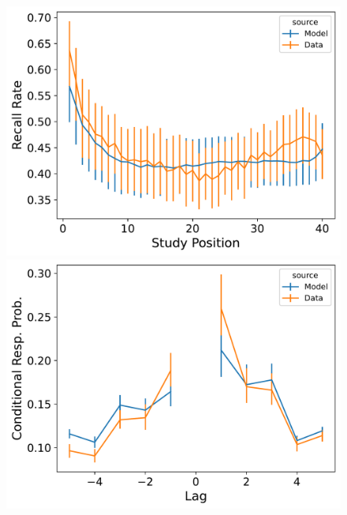 \documentclass[
  letterpaper,
  11pt,
  english,
  singlespacing,
  headsepline]{MastersDoctoralThesis}
\begin{document}
\begin{figure}
\begin{minipage}{0.33\linewidth}
\includegraphics{icmr_figures/LohnasKahana2014_TraceScalingCMR_Model_Fitting_spc-1.png}\end{minipage}%
\newline
\begin{minipage}{0.33\linewidth}
\includegraphics{icmr_figures/LohnasKahana2014_MultiScalingCMR_Model_Fitting_crp-1.png}\end{minipage}%
%
\begin{minipage}{0.33\linewidth}

\end{minipage}
\end{figure}
\end{document}
